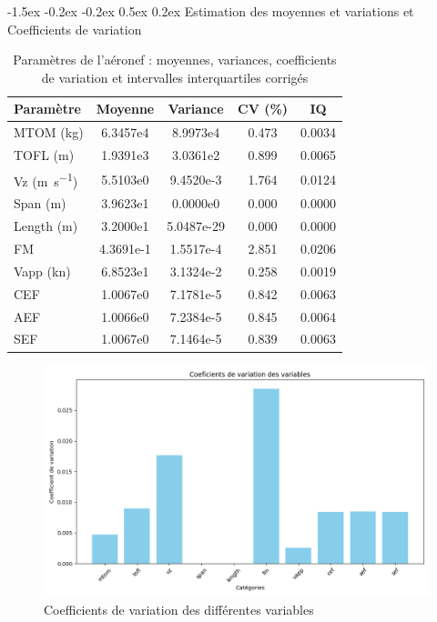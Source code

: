 \documentclass[a4paper, 11pt]{article}
\makeatletter
\newcounter{subsubsubsection}[subsubsection]
\newcommand\subsubsubsection{\@startsection{subsubsubsection}{4}{\z@}%
    {-1.5ex \@plus -0.2ex \@minus -0.2ex}%
    {0.5ex \@plus 0.2ex}%
    {\normalfont\normalsize\bfseries}}%
\makeatother
\begin{document}
\subsubsubsection{Estimation des moyennes et variations et Coefficients de variation}
\begin{table}[h]
\centering
\caption{Paramètres de l'aéronef : moyennes, variances, coefficients de variation et intervalles interquartiles corrigés}
\begin{tabular}{l S[table-format=5.5e1] S[table-format=3.5e1] S[table-format=1.3] S[table-format=1.4]}
\toprule
\textbf{Paramètre} & \textbf{Moyenne} & \textbf{Variance} & \textbf{CV (\%)} & \textbf{IQ} \\
\midrule
MTOM (\si{\kilo\gram}) & 6.3457e4 & 8.9973e4 & 0.473 & 0.0034 \\
TOFL (\si{\meter}) & 1.9391e3 & 3.0361e2 & 0.899 & 0.0065 \\
Vz (\si{\meter\per\second}) & 5.5103e0 & 9.4520e-3 & 1.764 & 0.0124 \\
Span (\si{\meter}) & 3.9623e1 & 0.0000e0 & 0.000 & 0.0000 \\
Length (\si{\meter}) & 3.2000e1 & 5.0487e-29 & 0.000 & 0.0000 \\
FM & 4.3691e-1 & 1.5517e-4 & 2.851 & 0.0206 \\
Vapp (\si{\knot}) & 6.8523e1 & 3.1324e-2 & 0.258 & 0.0019 \\
CEF & 1.0067e0 & 7.1781e-5 & 0.842 & 0.0063 \\
AEF & 1.0066e0 & 7.2384e-5 & 0.845 & 0.0064 \\
SEF & 1.0067e0 & 7.1464e-5 & 0.839 & 0.0063 \\
\bottomrule
\end{tabular}
\end{table}

\begin{figure}[H]
    \centering
    \includegraphics[width=0.9\linewidth]{Images_Ayoub/Problem2/X_opt/Estimating_Quantities/Coefficient_De_Variation/Coefficient_Var.png}
\caption{Coefficients de variation des différentes variables}
    \label{fig:enter-label}
\end{figure}
\end{document}
